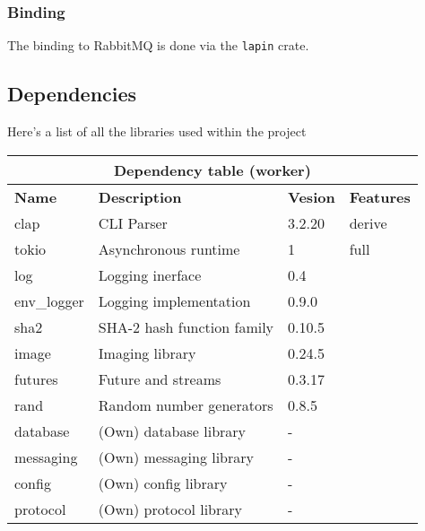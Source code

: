 \documentclass[../documentation.tex]{subfiles}
\begin{document}




\pagebreak

\subsubsection{Binding}

The binding to RabbitMQ is done via the \texttt{lapin} crate.

\subsection{Dependencies}

Here's a list of all the libraries used within the project

\bgroup{}
\def\arraystretch{1.5}
\begin{center}
    \begin{tabular}{ |p{2cm}|p{4cm}|p{1.5cm}|p{2cm}| }
        \hline
        \multicolumn{4}{|c|}{\textbf{Dependency table (worker)}} \\
        \hline
        \textbf{Name} & \textbf{Description} & \textbf{Vesion} & \textbf{Features} \\
        \hline
        clap & CLI Parser & 3.2.20 & derive \\
        \hline
        tokio & Asynchronous runtime & 1 & full \\
        \hline
        log & Logging inerface & 0.4 & \\
        \hline
        env\_logger & Logging implementation & 0.9.0 & \\
        \hline
        sha2 & SHA-2 hash function family & 0.10.5 & \\
        \hline
        image & Imaging library & 0.24.5 & \\
        \hline
        futures & Future and streams & 0.3.17 & \\
        \hline
        rand & Random number generators & 0.8.5 & \\
        \hline
        database & (Own) database library & - & \\
        \hline
        messaging & (Own) messaging library & - & \\
        \hline
        config & (Own) config library & - & \\
        \hline
        protocol & (Own) protocol library & - & \\
        \hline
    \end{tabular}
\end{center}
\egroup{}
\end{document}
